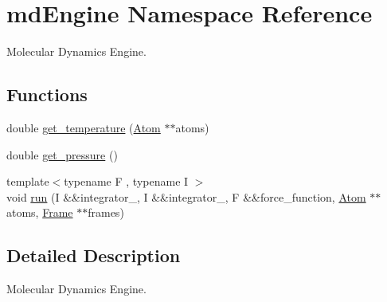 \hypertarget{namespacemd_engine}{}\section{md\+Engine Namespace Reference}
\label{namespacemd_engine}


Molecular Dynamics Engine.  


\subsection*{Functions}
\begin{DoxyCompactItemize}
\item 
double \mbox{\hyperlink{group___main__modules_ga5f8cc3610166e26157ab48c1905bd2b7}{get\+\_\+temperature}} (\mbox{\hyperlink{class_atom}{Atom}} $\ast$$\ast$atoms)
\item 
double \mbox{\hyperlink{group___main__modules_ga43703c5bde3f0a0ffd916e8c030d5d33}{get\+\_\+pressure}} ()
\item 
{\footnotesize template$<$typename F , typename I $>$ }\\void \mbox{\hyperlink{group___main__modules_ga9814b46948bb9bf9930a3a9392aa3a94}{run}} (I \&\&integrator\+\_, I \&\&integrator\+\_, F \&\&force\+\_\+function, \mbox{\hyperlink{class_atom}{Atom}} $\ast$$\ast$atoms, \mbox{\hyperlink{class_frame}{Frame}} $\ast$$\ast$frames)
\end{DoxyCompactItemize}


\subsection{Detailed Description}
Molecular Dynamics Engine. 